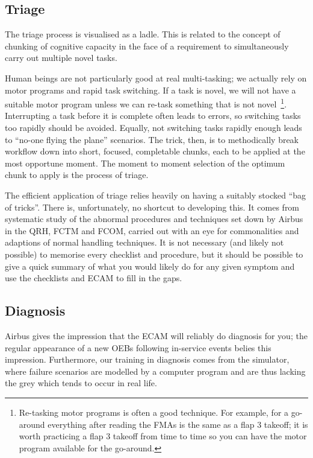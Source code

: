 \documentclass[a4paper,12pt]{article}
\begin{document}
\subsection{Triage}
The triage process is visualised as a ladle. This is related to the
concept of chunking of cognitive capacity in the face of a requirement
to simultaneously carry out multiple novel tasks.

Human beings are not particularly good at real multi-tasking; we
actually rely on motor programs and rapid task switching. If a task is
novel, we will not have a suitable motor program unless we can re-task
something that is not novel\
\footnote{Re-tasking motor programs is often a good technique. For
  example, for a go-around everything after reading the FMAs is the same
  as a flap 3 takeoff; it is worth practicing a flap 3 takeoff from time
  to time so you can have the motor program available for the
  go-around.}. Interrupting a task before it is complete often leads to
errors, so switching tasks too rapidly should be avoided. Equally, not
switching tasks rapidly enough leads to ``no-one flying the plane''
scenarios. The trick, then, is to methodically break workflow down into
short, focused, completable chunks, each to be applied at the most
opportune moment. The moment to moment selection of the optimum chunk to
apply is the process of triage.

The efficient application of triage relies heavily on having a suitably
stocked ``bag of tricks''. There is, unfortunately, no shortcut to
developing this. It comes from systematic study of the abnormal
procedures and techniques set down by Airbus in the QRH, FCTM and FCOM,
carried out with an eye for commonalities and adaptions of normal
handling techniques. It is not necessary (and likely not possible) to
memorise every checklist and procedure, but it should be possible to
give a quick summary of what you would likely do for any given symptom
and use the checklists and ECAM to fill in the gaps.

\subsection{Diagnosis}

Airbus gives the impression that the ECAM will reliably do diagnosis for
you; the regular appearance of a new OEBs following in-service events
belies this impression. Furthermore, our training in diagnosis comes
from the simulator, where failure scenarios are modelled by a computer
program and are thus lacking the grey which tends to occur in real life.
\end{document}

